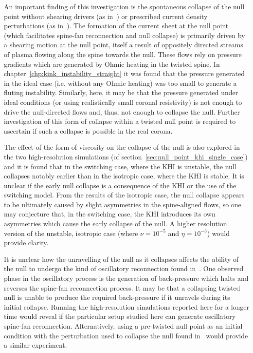 An important finding of this investigation is the spontaneous collapse of the null point without shearing drivers (as in~\cite{pontinCurrentSheetFormation2007}) or prescribed current density perturbations (as in~\cite{thurgoodImplosiveCollapseMagnetic2018}). The formation of the current sheet at the null point (which facilitates spine-fan reconnection and null collapse) is primarily driven by a shearing motion at the null point, itself a result of oppositely directed streams of plasma flowing along the spine towards the null. These flows rely on pressure gradients which are generated by Ohmic heating in the twisted spine. In chapter~\ref{chp:kink_instability_straight} it was found that the pressure generated in the ideal case (i.e. without any Ohmic heating) was too small to generate a fluting instability. Similarly, here, it may be that the pressure generated under ideal conditions (or using realistically small coronal resistivity) is not enough to drive the null-directed flows and, thus, not enough to collapse the null. Further investigation of this form of collapse within a twisted null point is required to ascertain if such a collapse is possible in the real corona.

The effect of the form of viscosity on the collapse of the null is also explored in the two high-resolution simulations (of section~\ref{sec:null_point_khi_single_case}) and it is found that in the switching case, where the KHI is unstable, the null collapses notably earlier than in the isotropic case, where the KHI is stable. It is unclear if the early null collapse is a consequence of the KHI or the use of the switching model. From the results of the isotropic case, the null collapse appears to be ultimately caused by slight asymmetries in the spine-aligned flows, so one may conjecture that, in the switching case, the KHI introduces its own asymmetries which cause the early collapse of the null. A higher resolution version of the unstable, isotropic case (where $\nu = 10^{-5}$ and $\eta=10^{-3}$) would provide clarity. 

It is unclear how the unravelling of the null as it collapses affects the ability of the null to undergo the kind of oscillatory reconnection found in~\cite{thurgoodThreedimensionalOscillatoryMagnetic2017}. One observed phase in the oscillatory process is the generation of back-pressure which halts and reverses the spine-fan reconnection process. It may be that a collapsing twisted null is unable to produce the required back-pressure if it unravels during its initial collapse. Running the high-resolution simulations reported here for a longer time would reveal if the particular setup studied here can generate oscillatory spine-fan reconnection. Alternatively, using a pre-twisted null point as an initial condition with the perturbation used to collapse the null found in~\cite{thurgoodThreedimensionalOscillatoryMagnetic2017} would provide a similar experiment.


